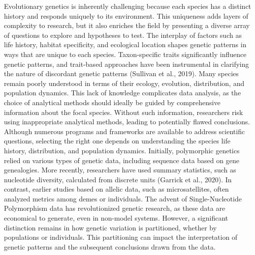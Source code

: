 \documentclass[
]{article}
\begin{document}
Evolutionary genetics is inherently challenging because each species has
a distinct history and responds uniquely to its environment. This
uniqueness adds layers of complexity to research, but it also enriches
the field by presenting a diverse array of questions to explore and
hypotheses to test. The interplay of factors such as life history,
habitat specificity, and ecological location shapes genetic patterns in
ways that are unique to each species. Taxon-specific traits
significantly influence genetic patterns, and trait-based approaches
have been instrumental in clarifying the nature of discordant genetic
patterns (Sullivan et al., 2019). Many species remain poorly understood
in terms of their ecology, evolution, distribution, and population
dynamics. This lack of knowledge complicates data analysis, as the
choice of analytical methods should ideally be guided by comprehensive
information about the focal species. Without such information,
researchers risk using inappropriate analytical methods, leading to
potentially flawed conclusions. Although numerous programs and
frameworks are available to address scientific questions, selecting the
right one depends on understanding the species\textquotesingle{} life
history, distribution, and population dynamics. Initially, polymorphic
genetics relied on various types of genetic data, including sequence
data based on gene genealogies. More recently, researchers have used
summary statistics, such as nucleotide diversity, calculated from
discrete units (Garrick et al., 2020). In contrast, earlier studies
based on allelic data, such as microsatellites, often analyzed metrics
among demes or individuals. The advent of Single-Nucleotide Polymorphism
data has revolutionized genetic research, as these data are economical
to generate, even in non-model systems. However, a significant
distinction remains in how genetic variation is partitioned, whether by
populations or individuals. This partitioning can impact the
interpretation of genetic patterns and the subsequent conclusions drawn
from the data.
\end{document}
